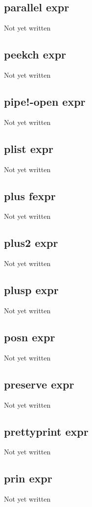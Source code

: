 \documentclass[a4paper,11pt]{article}
\begin{document}
{\subsection{\ttfamily parallel expr}
Not yet written

\subsection{\ttfamily peekch expr}
Not yet written

\subsection{\ttfamily pipe!-open expr}
Not yet written

\subsection{\ttfamily plist expr}
Not yet written

\subsection{\ttfamily plus fexpr}
Not yet written

\subsection{\ttfamily plus2 expr}
Not yet written

\subsection{\ttfamily plusp expr}
Not yet written

\subsection{\ttfamily posn expr}
Not yet written

\subsection{\ttfamily preserve expr}
Not yet written

\subsection{\ttfamily prettyprint expr}
Not yet written

\subsection{\ttfamily prin expr}
Not yet written

}
\end{document}
